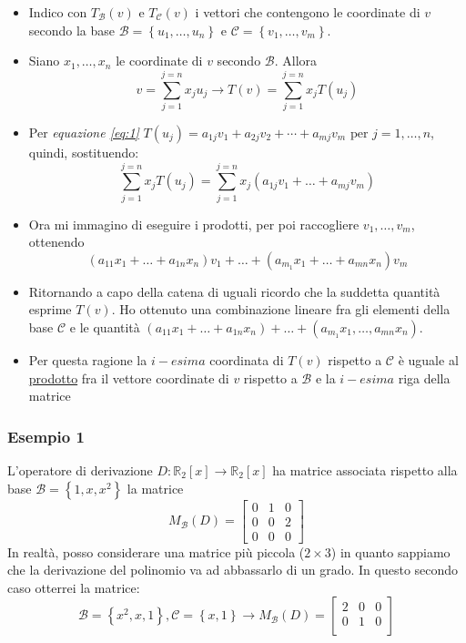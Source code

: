 \documentclass[12pt,a4paper,oneside]{article}
\begin{document}
\begin{itemize}
	\item Indico con $ T_\mathcal{B}\left( v \right)  $ e $ T_\mathcal{C}\left( v \right)  $ i vettori che contengono le coordinate di $ v $ secondo la base $ \mathcal{B} = \left\{ u_1,\ldots,u_n \right\} $ e $ \mathcal{C} = \left\{ v_1,\ldots,v_m \right\} $.
	\item Siano $ x_1,\ldots,x_n $ le coordinate di $ v $ secondo $ \mathcal{B} $. Allora
	      \[
		      v= \sum_{j=1}^{j=n} x_ju_j \rightarrow T\left( v \right) = \sum_{j=1}^{j=n} x_j T\left( u_j \right)
	      \]
	\item Per \textit{equazione \ref{eq:1}} $ T\left(u_j\right)=a_{1 j} v_1+a_{2 j} v_2+\cdots+a_{m j} v_m \text{ per } j=1, \ldots, n $, quindi, sostituendo:
	      \[
		      \sum_{j=1}^{j=n} x_j T\left( u_j \right)=\sum_{j=1}^{j=n} x_j\left( a_{1j}v_1+\ldots+a_{mj}v_m \right)
	      \]
	\item Ora mi immagino di eseguire i prodotti, per poi raccogliere $ v_1,\ldots,v_m $, ottenendo
	      \[
		      \left( a_{11}x_1 +\ldots + a_{1n}x_n \right)v_1 + \ldots + \left( a_{m_1}x_1 + \ldots + a_{mn}x_n \right) v_m
	      \]
	\item Ritornando a capo della catena di uguali ricordo che la suddetta quantità esprime $ T\left( v \right)  $. Ho ottenuto una combinazione lineare fra gli elementi della base $ \mathcal{C} $ e le quantità 	$\left( a_{11}x_1 +\ldots + a_{1n}x_n \right) + \ldots + \left( a_{m_1}x_1 , \ldots , a_{mn}x_n \right)  $.
	\item Per questa ragione la $ i-esima $ coordinata di $ T\left( v \right)  $ rispetto a $ \mathcal{C} $ è uguale al \underline{prodotto} fra il vettore coordinate di $ v $ rispetto a $ \mathcal{B} $ e la $ i-esima $ riga della matrice
\end{itemize}
\subsubsection*{Esempio 1}
L'operatore di derivazione $D: \mathbb{R}_2[x] \rightarrow \mathbb{R}_2[x]$ ha matrice associata rispetto alla base $\mathcal{B}=\left\{1, x, x^2\right\}$ la matrice
$$
	M_{\mathcal{B}}(D)=\left[\begin{array}{lll}
			0 & 1 & 0 \\
			0 & 0 & 2 \\
			0 & 0 & 0
		\end{array}\right]
$$
In realtà, posso considerare una matrice più piccola ($ 2 \times 3 $) in quanto sappiamo che la derivazione del polinomio va ad abbassarlo di un grado. In questo secondo caso otterrei la matrice:
\[
	\mathcal{B}=\left\{ x^2,x,1 \right\} , \mathcal{C}= \left\{ x,1 \right\}  \rightarrow
	M_{\mathcal{B}}(D)=
	\begin{bmatrix}
		2 & 0 & 0 \\
		0 & 1 & 0 \\
	\end{bmatrix}
\]
\end{document}
